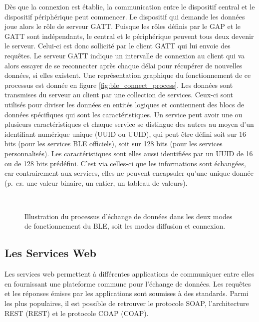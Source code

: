 Dès que la connexion est établie, la communication entre le dispositif central et le dispositif périphérique peut commencer. Le dispositif qui demande les données joue alors le rôle de serveur \acs{GATT}. Puisque les rôles définis par le \acs{GAP} et le \acs{GATT} sont indépendants, le central et le périphérique peuvent tous deux devenir le serveur. Celui-ci est donc sollicité par le client \acs{GATT} qui lui envoie des requêtes. Le serveur \acs{GATT} indique un intervalle de connexion au client qui va alors essayer de se reconnecter après chaque délai pour récupérer de nouvelles données, si elles existent. Une représentation graphique du fonctionnement de ce processus est donnée en figure \ref{fig:ble_connect_process}. Les données sont transmises du serveur au client par une collection de services. Ceux-ci sont utilisés pour diviser les données en entités logiques et contiennent des blocs de données spécifiques qui sont les caractéristiques. Un service peut avoir une ou plusieurs caractéristiques et chaque service se distingue des autres au moyen d’un identifiant numérique unique (\acl{UUID} ou \acs{UUID}), qui peut être défini soit sur 16 bits (pour les services BLE officiels), soit sur 128 bits (pour les services personnalisés). Les caractéristiques sont elles aussi identifiées par un \acs{UUID} de 16 ou de 128 bits prédéfini. C'est via celles-ci que les informations sont échangées, car contrairement aux services, elles ne peuvent encapsuler qu'une unique donnée (\textit{p. ex.} une valeur binaire, un entier, un tableau de valeurs).

\begin{figure}[H]
	\centering
    \\[10pt]
	\caption{Illustration du processus d'échange de données dans les deux modes de fonctionnement du \acs{BLE}, soit les modes diffusion et connexion.}
\end{figure}

\subsection{Les Services Web}

Les services web permettent à différentes applications de communiquer entre elles en fournissant une plateforme commune pour l'échange de données. Les requêtes et les réponses émises par les applications sont soumises à des standards. Parmi les plus populaires, il est possible de retrouver le protocole \ac{SOAP}, l'architecture \acl{REST} (\acs{REST}) et le protocole \acl{COAP} (\acs{COAP}).

